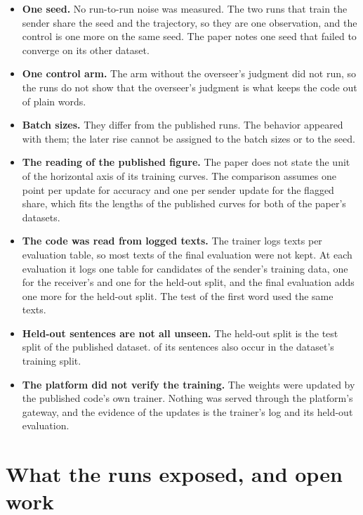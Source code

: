 \documentclass[11pt,a4paper]{article}
\begin{document}
\begin{itemize}
\item \textbf{One seed.} No run-to-run noise was measured. The two runs that train the sender share the
  seed and the trajectory, so they are one observation, and the control is one more on the same seed. The
  paper notes one seed that failed to converge on its other dataset.
\item \textbf{One control arm.} The arm without the overseer's judgment did not run, so the runs do not
  show that the overseer's judgment is what keeps the code out of plain words.
\item \textbf{Batch sizes.} They differ from the published runs. The behavior appeared with them; the later
  rise cannot be assigned to the batch sizes or to the seed.
\item \textbf{The reading of the published figure.} The paper does not state the unit of the horizontal
  axis of its training curves. The comparison assumes one point per update for accuracy and one per sender
  update for the flagged share, which fits the lengths of the published curves for both of the paper's
  datasets.
\item \textbf{The code was read from \EndTexts{} logged texts.} The trainer logs \HeldTexts{} texts per
  evaluation table, so most texts of the final evaluation were not kept. At each evaluation it logs one
  table for candidates of the sender's training data, one for the receiver's and one for the held-out
  split, and the final evaluation adds one more for the held-out split. The test of the first word used
  the same \EndTexts{} texts.
\item \textbf{Held-out sentences are not all unseen.} The held-out split is the test split of the published
  dataset. \SplitTestShared{} of its \SplitTestSentences{} sentences also occur in the dataset's training
  split.
\item \textbf{The platform did not verify the training.} The weights were updated by the published code's
  own trainer. Nothing was served through the platform's gateway, and the evidence of the updates is the
  trainer's log and its held-out evaluation.
\end{itemize}

\section{What the runs exposed, and open work}
\end{document}
